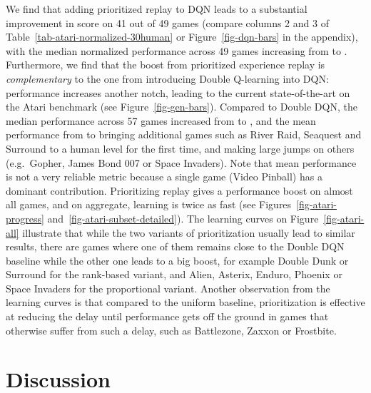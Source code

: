 \documentclass[a4paper]{article}
\begin{document}
We find that adding prioritized replay to DQN leads to a substantial improvement in score on 41 out of 49 games
(compare columns 2 and 3 of Table~\ref{tab-atari-normalized-30human} or Figure~\ref{fig-dqn-bars} in the appendix), 
with the median normalized performance across 49 games increasing from  to . 
Furthermore, we find that the boost from prioritized experience replay is \emph{complementary} to the one 
from introducing Double Q-learning into DQN: 
performance increases another notch, leading to the current state-of-the-art on the Atari benchmark
(see Figure~\ref{fig-gen-bars}). 
Compared to Double DQN, the median performance across 57 games increased from  to , and the mean performance from  to  bringing
additional games such as River Raid, Seaquest and Surround to a human level for the first time, and making large jumps on others (e.g.\ Gopher, James Bond 007 or Space Invaders).
Note that mean performance is not a very reliable metric because a single game (Video Pinball) has a dominant contribution.
Prioritizing replay gives a performance boost on almost all games, 
and on aggregate, learning is twice as fast (see Figures~\ref{fig-atari-progress} and~\ref{fig-atari-subset-detailed}).
The learning curves on Figure~\ref{fig-atari-all} illustrate that while the two variants of prioritization usually lead to similar results,
there are games where one of them remains close to the Double DQN baseline while the other one leads to a big boost,
for example Double Dunk or Surround for the rank-based variant, and Alien, Asterix, Enduro, Phoenix or Space Invaders for the proportional variant.
Another observation from the learning curves is that compared to the uniform baseline, prioritization is effective at reducing the delay until performance gets off the ground in games that otherwise suffer from such a delay, such as Battlezone, Zaxxon or Frostbite. 


\section{Discussion}
\end{document}
